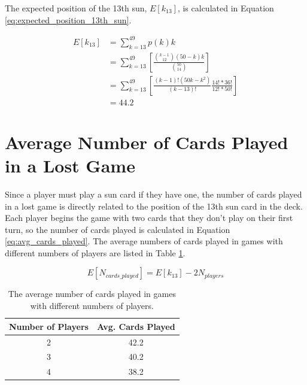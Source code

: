 \documentclass{article}
\begin{document}
The expected position of the 13th sun, $E[k_{13}]$, is calculated in Equation \ref{eq:expected_position_13th_sun}.

\begin{equation} \label{eq:expected_position_13th_sun}
\begin{split}
E[k_{13}] & = \sum_{k=13}^{49}p(k)k \\
& = \sum_{k=13}^{49} \left[ \frac{\binom{k-1}{12} \left( 50-k \right)k}{\binom{50}{14}} \right] \\
& = \sum_{k=13}^{49} \left[ \frac{(k-1)!(50k-k^{2})} {(k-13)!} \frac{14!*36!}{12!*50!} \right] \\
& = 44.2
\end{split}
\end{equation}

\section{Average Number of Cards Played in a Lost Game}
Since a player must play a sun card if they have one, the number of cards played in a lost game is directly related to the position of the 13th sun card in the deck.  Each player begins the game with two cards that they don't play on their first turn, so the number of cards played is calculated in Equation \ref{eq:avg_cards_played}.  The average numbers of cards played in games with different numbers of players are listed in Table \ref{tb:avg_cards_played}.

\begin{equation} \label{eq:avg_cards_played}
  E[N_{cards\_played}] = E[k_{13}] - 2 N_{players}
\end{equation}

\begin{table}
  \centering
  \begin{tabular}{| c | c |}
    \hline
    Number of Players & Avg. Cards Played \\ \hline
    2 & 42.2 \\ \hline
    3 & 40.2 \\ \hline
    4 & 38.2 \\ \hline
  \end{tabular}
  \caption{The average number of cards played in games with different numbers of players.}
  \label{tb:avg_cards_played}
  \end{table}
\end{document}
